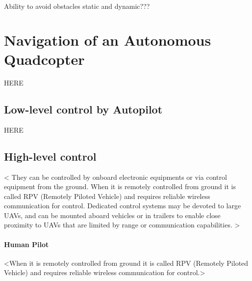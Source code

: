 Ability to avoid obstacles
static and dynamic???








\section{Navigation of an Autonomous Quadcopter}

HERE

\subsection{Low-level control by Autopilot}

HERE

\subsection{High-level control}

<
They can be controlled by onboard electronic equipments 
or via control equipment from the ground. 
When it is remotely controlled from ground 
it is called RPV (Remotely Piloted Vehicle) 
and requires reliable wireless communication for control. 
Dedicated control systems may be devoted to large UAVs, 
and can be mounted aboard vehicles or in trailers 
to enable close proximity to UAVs that are 
limited by range or communication capabilities.
>


\paragraph{Human Pilot}
<When it is remotely controlled from ground 
it is called RPV (Remotely Piloted Vehicle) 
and requires reliable wireless communication for control.>







